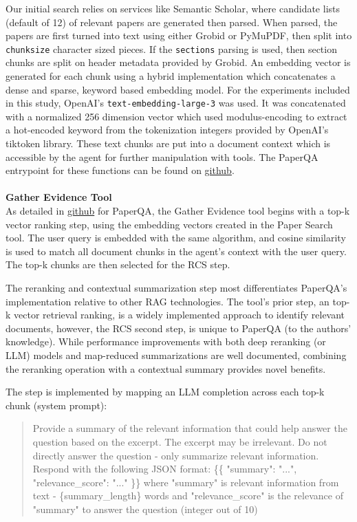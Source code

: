 Our initial search relies on services like Semantic Scholar\cite{semantic-scholar}, where candidate lists (default of 12) of relevant papers are generated then parsed. When parsed, the papers are first turned into text using either Grobid or PyMuPDF, then split into \texttt{chunksize} character sized pieces. If the \texttt{sections} parsing is used, then section chunks are split on header metadata provided by Grobid. An embedding vector is generated for each chunk using a hybrid implementation which concatenates a dense and sparse, keyword based embedding model. For the experiments included in this study, OpenAI's \texttt{text-embedding-large-3} was used. It was concatenated with a normalized 256 dimension vector which used modulus-encoding to extract a hot-encoded keyword from the tokenization integers provided by OpenAI's tiktoken \cite{tiktoken} library. These text chunks are put into a document context which is accessible by the agent for further manipulation with tools. The PaperQA entrypoint for these functions can be found on \href{https://github.com/Future-House/paper-qa}{github}. \\ \\


\textbf{Gather Evidence Tool} \\

As detailed in \href{https://github.com/Future-House/paper-qa}{github} for PaperQA, the Gather Evidence tool begins with a top-k vector ranking step, using the embedding vectors created in the Paper Search tool. The user query is embedded with the same algorithm, and cosine similarity is used to match all document chunks in the agent's context with the user query. The top-k chunks are then selected for the RCS step. 

The reranking and contextual summarization step most differentiates PaperQA's implementation relative to other RAG technologies. The tool's prior step, an top-k vector retrieval ranking, is a widely implemented \cite{ma2023queryrewritingretrievalaugmentedlarge, gao2023retrieval} approach to identify relevant documents, however, the RCS second step, is unique to PaperQA (to the authors' knowledge). While performance improvements with both deep reranking (or LLM) models and map-reduced summarizations \cite{sarthi2024raptor, zhuang2023opensourcellm, gao2023chatrec, yu2024rankrag} are well documented, combining the reranking operation with a contextual summary provides novel benefits. 

The step is implemented by mapping an LLM completion across each top-k chunk (system prompt):
\begin{quote}
Provide a summary of the relevant information that could help answer the question based on the excerpt. The excerpt may be irrelevant.  Do not directly answer the question - only summarize relevant information. Respond with the following JSON format:
\{\{ "summary": "...",  \\
"relevance\_score": "..."
\}\}
where "summary" is relevant information from text - \{summary\_length\} words and "relevance\_score" is the relevance of "summary" to answer the question (integer out of 10)
\end{quote}

